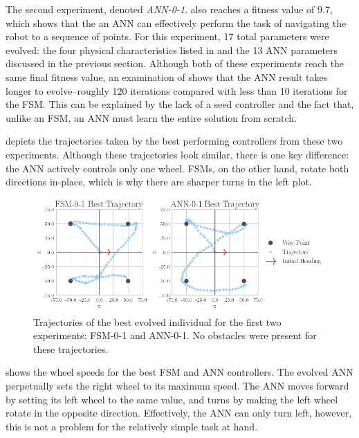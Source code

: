 The second experiment, denoted \emph{ANN-0-1}. also reaches a fitness value of 9.7, which shows that the an ANN can effectively perform the task of navigating the robot to a sequence of points.
%
For this experiment, 17 total parameters were evolved: the four physical characteristics listed in  and the 13 ANN parameters discussed in the previous section.
%
Although both of these experiments reach the same final fitness value, an examination of  shows that the ANN result takes longer to evolve--roughly 120 iterations compared with less than 10 iterations for the FSM.
%
This can be explained by the lack of a seed controller and the fact that, unlike an FSM, an ANN must learn the entire solution from scratch.


 depicts the trajectories taken by the best performing controllers from these two experiments.
%
Although these trajectories look similar, there is one key difference: the ANN actively controls only one wheel. FSMs, on the other hand, rotate both directions in-place, which is why there are sharper turns in the left plot.


\begin{figure}[!ht]
    \centering

    \includegraphics[width=\columnwidth]{figures/4-results/0-1-best_trajectories.png}

    \vspace{-0.12in}

    \caption{Trajectories of the best evolved individual for the first two experiments: FSM-0-1 and ANN-0-1. No obstacles were present for these trajectories.}
    \label{fig:0-1-best-trajectories}

    \vspace{-0.1in}
\end{figure}


 shows the wheel speeds for the best FSM and ANN controllers.
%
The evolved ANN perpetually sets the right wheel to its maximum speed.
%
The ANN moves forward by setting its left wheel to the same value, and turns by making the left wheel rotate in the opposite direction.
%
Effectively, the ANN can only turn left, however, this is not a problem for the relatively simple task at hand.



